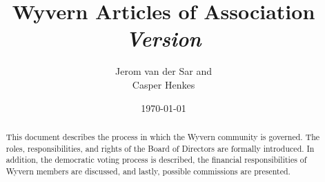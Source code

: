 \documentclass[a4paper]{article}
\title{
    Wyvern Articles of Association\\
    \vspace{10px}
    \large \textit{Version \versionnumber}
}
\author{
    Jerom van der Sar and\\
    Casper Henkes
}
\date{\today}
\begin{document}
\begin{titlepage}
    \maketitle
    \begin{abstract}
        This document describes the process in which the Wyvern community is governed. The roles, responsibilities, and rights of the Board of Directors are formally introduced. In addition, the democratic voting process is described, the financial responsibilities of Wyvern members are discussed, and lastly, possible commissions are presented.
    \end{abstract}
\end{titlepage}






\end{document}
